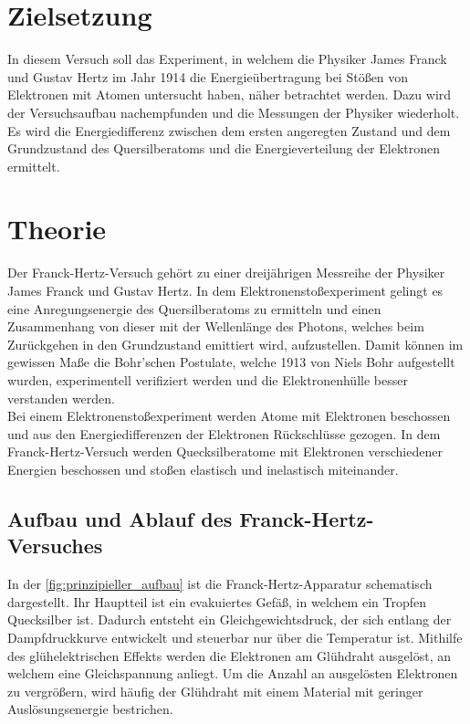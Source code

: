 \section{Zielsetzung}
\label{sec:zielsetzung}

    In diesem Versuch soll das Experiment, in welchem die Physiker James Franck und Gustav Hertz im Jahr 1914 die Energieübertragung bei Stößen von Elektronen mit 
    Atomen untersucht haben, näher betrachtet werden. Dazu wird der Versuchsaufbau nachempfunden und die Messungen der Physiker wiederholt. Es wird die 
    Energiedifferenz zwischen dem ersten angeregten Zustand und dem Grundzustand des Quersilberatoms und die Energieverteilung der Elektronen ermittelt. 

\section{Theorie}
\label{sec:Theorie}

    Der Franck-Hertz-Versuch gehört zu einer dreijährigen Messreihe der Physiker James Franck und Gustav Hertz. In dem Elektronenstoßexperiment gelingt es eine
    Anregungsenergie des Quersilberatoms zu ermitteln und einen Zusammenhang von dieser mit der Wellenlänge des Photons, welches beim Zurückgehen in den 
    Grundzustand emittiert wird, aufzustellen. Damit können im gewissen Maße die Bohr'schen Postulate, welche 1913 von Niels Bohr aufgestellt wurden, experimentell verifiziert 
    werden und die Elektronenhülle besser verstanden werden. \\
    
    \noindent Bei einem Elektronenstoßexperiment werden Atome mit Elektronen beschossen und aus den Energiedifferenzen der Elektronen Rückschlüsse gezogen. 
    In dem Franck-Hertz-Versuch werden Quecksilberatome mit Elektronen verschiedener Energien beschossen und stoßen elastisch und inelastisch miteinander. 


\subsection{Aufbau und Ablauf des Franck-Hertz-Versuches}

    In der \autoref{fig:prinzipieller_aufbau} ist die Franck-Hertz-Apparatur schematisch dargestellt. Ihr Hauptteil ist ein evakuiertes Gefäß, in welchem ein 
    Tropfen Quecksilber ist. Dadurch entsteht ein Gleichgewichtsdruck, der sich entlang der Dampfdruckkurve entwickelt und steuerbar nur über die Temperatur ist. 
    Mithilfe des glühelektrischen Effekts werden die Elektronen am Glühdraht ausgelöst, an welchem eine Gleichspannung anliegt. Um die Anzahl an ausgelösten 
    Elektronen zu vergrößern, wird häufig der Glühdraht mit einem Material mit geringer Auslösungsenergie bestrichen. 

